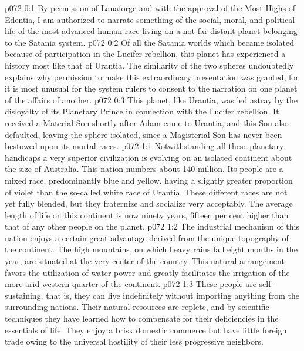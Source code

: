 \author{Melchizedek}
\vs p072 0:1 By permission of Lanaforge and with the approval of the Most Highs of Edentia, I am authorized to narrate something of the social, moral, and political life of the most advanced human race living on a not far\hyp{}distant planet belonging to the Satania system.
\vs p072 0:2 Of all the Satania worlds which became isolated because of participation in the Lucifer rebellion, this planet has experienced a history most like that of Urantia. The similarity of the two spheres undoubtedly explains why permission to make this extraordinary presentation was granted, for it is most unusual for the system rulers to consent to the narration on one planet of the affairs of another.
\vs p072 0:3 This planet, like Urantia, was led astray by the disloyalty of its Planetary Prince in connection with the Lucifer rebellion. It received a Material Son shortly after Adam came to Urantia, and this Son also defaulted, leaving the sphere isolated, since a Magisterial Son has never been bestowed upon its mortal races.
\vs p072 1:1 Notwithstanding all these planetary handicaps a very superior civilization is evolving on an isolated continent about the size of Australia. This nation numbers about 140 million. Its people are a mixed race, predominantly blue and yellow, having a slightly greater proportion of violet than the so\hyp{}called white race of Urantia. These different races are not yet fully blended, but they fraternize and socialize very acceptably. The average length of life on this continent is now ninety years, fifteen per cent higher than that of any other people on the planet.\plusone
\vs p072 1:2 The industrial mechanism of this nation enjoys a certain great advantage derived from the unique topography of the continent. The high mountains, on which heavy rains fall eight months in the year, are situated at the very center of the country. This natural arrangement favors the utilization of water power and greatly facilitates the irrigation of the more arid western quarter of the continent.
\vs p072 1:3 These people are self\hyp{}sustaining, that is, they can live indefinitely without importing anything from the surrounding nations. Their natural resources are replete, and by scientific techniques they have learned how to compensate for their deficiencies in the essentials of life. They enjoy a brisk domestic commerce but have little foreign trade owing to the universal hostility of their less progressive neighbors.
